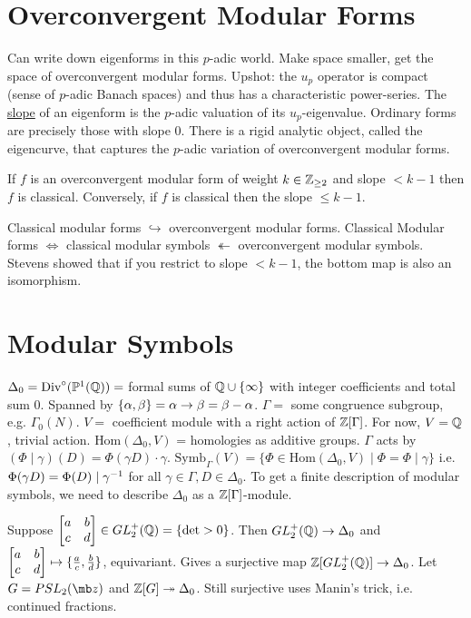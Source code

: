 \documentclass[]{article}
\begin{document}
\section*{Overconvergent Modular Forms}

Can write down eigenforms in this $p$-adic world. Make space smaller, get the space of overconvergent modular forms. Upshot: the $u_p$ operator is compact (sense of $p$-adic Banach spaces) and thus has a characteristic power-series. The \ul{slope} of an eigenform is the $p$-adic valuation of its $u_p$-eigenvalue. Ordinary forms are precisely those with slope 0. There is a rigid analytic object, called the eigencurve, that captures the $p$-adic variation of overconvergent modular forms.

\begin{theorem}
	If $f$ is an overconvergent modular form of weight $k\in\mathbb{Z}_{\geq 2}$ and slope $<k-1$ then $f$ is classical. Conversely, if $f$ is classical then the slope $\leq k-1$.
\end{theorem}
Classical modular forms $\hookrightarrow$ overconvergent modular forms. Classical Modular forms $\iff$ classical modular symbols $\twoheadleftarrow$ overconvergent modular symbols.
Stevens showed that if you restrict to slope $<k-1$, the bottom map is also an isomorphism.

\section*{Modular Symbols}

$\Delta_0 = \text{Div}^\circ (\mathbb{P}^1(\mathbb{Q})) = $ formal sums of $\mathbb{Q}\cup \{\infty\}$ with integer coefficients and total sum 0. Spanned by $\{\alpha,\beta\} = \alpha \rightarrow \beta = \beta-\alpha$. $\Gamma = $ some congruence subgroup, e.g. $\Gamma_0(N)$. $V =$ coefficient module with a right action of $\mathbb{Z}[\Gamma]$. For now, $V = \mathbb{Q}$, trivial action. $\text{Hom}(\Delta_0,V)$ = homologies as additive groups. $\Gamma$ acts by $(\Phi\mid \gamma)(D) = \Phi(\gamma D)\cdot \gamma$. $\text{Symb}_\Gamma(V) = \{\Phi\in \text{Hom}(\Delta_0,V) \mid \Phi = \Phi \mid \gamma\}$ i.e. $\Phi(\gamma D) = \Phi(D)\mid \gamma^{-1}$ for all $\gamma\in \Gamma, D\in\Delta_0$. To get a finite description of modular symbols, we need to describe $\Delta_0$ as a $\mathbb{Z}[\Gamma]$-module.

Suppose $\begin{bmatrix}a&b\\c&d\end{bmatrix} \in GL_2^+(\mathbb{Q}) = \{\det>0\}$. Then $GL_2^+(\mathbb{Q})\rightarrow \Delta_0$ and $\begin{bmatrix}a&b\\c&d\end{bmatrix} \mapsto \{\frac{a}{c},\frac{b}{d}\}$, equivariant. Gives a surjective map $\mathbb{Z}[GL_2^+(\mathbb{Q})] \rightarrow \Delta_0$. Let $G = PSL_2(\mb z)$ and $\mathbb{Z}[G]\twoheadrightarrow \Delta_0$. Still surjective uses Manin's trick, i.e. continued fractions.
\end{document}
